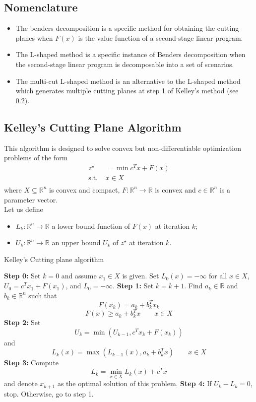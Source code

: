 \documentclass[12pt, openany]{report}
\newcommand{\R}{\mathbb{R}}
\theoremstyle{definition}
\begin{document}
\subsection{Nomenclature}
\begin{itemize}
	\item The benders decomposition is a specific method for obtaining the cutting planes when $F(x)$ is the value function of a second-stage linear program. 
	\item The L-shaped method is a specific instance of Benders decomposition when the second-stage linear program is decomposable into a set of scenarios.
	\item The multi-cut L-shaped method is an alternative to the L-shaped method which generates multiple cutting planes at step 1 of Kelley's method (see \ref{sec:Kelley}). 
\end{itemize}
\subsection{Kelley's Cutting Plane Algorithm}\label{sec:Kelley}
This algorithm is designed to solve convex but non-differentiable optimization problems of the form
\begin{equation}
	\begin{aligned}
		z^\star &= \min c^Tx + F(x)\\
		\text{s.t. }& x\in X\\
	\end{aligned}
\end{equation}
where $X\subseteq \R^n$ is convex and compact, $F:\R^n\to \R$ is convex and $c\in \R^n$ is a parameter vector. \\
Let us define 
\begin{itemize}
	\item $L_k:\R^n\to \R$ a lower bound function of $F(x)$ at iteration $k$;
	\item $U_k:\R^n\to \R$ an upper bound $U_k$ of $z^\star$ at iteration $k$.
\end{itemize}
\begin{algorithm}
    \caption{Kelley's Cutting plane algorithm}\label{algo:Kelley}
    \begin{algorithmic}[1]
    \State \textbf{Step 0:} Set $k=0$ and assume $x_1\in X$ is given. Set $L_0(x)=-\infty$ for all $x\in X$, $U_0 = c^Tx_1 + F(x_1)$, and $L_0 = -\infty$.
	\State \textbf{Step 1:} Set $k=k+1$. Find $a_k\in \R$ and $b_k\in \R^n$ such that \[F(x_k)=a_k+b_k^Tx_k\] \[F(x)\ge a_k + b_k^Tx\qquad x\in X\]
	\State \textbf{Step 2:} Set \[U_k = \min(U_{k-1},c^Tx_k + F(x_k))\] and \[L_k(x) = \max(L_{k-1}(x),a_k+b_k^Tx) \qquad x\in X\]
	\State \textbf{Step 3:} Compute \[L_k = \min_{x\in X} L_k(x) + c^Tx\] and denote $x_{k+1}$ as the optimal solution of this problem.
	\State \textbf{Step 4:} If $U_k - L_k =0$, stop. Otherwise, go to step 1.
    \end{algorithmic}
\end{algorithm}
\end{document}
